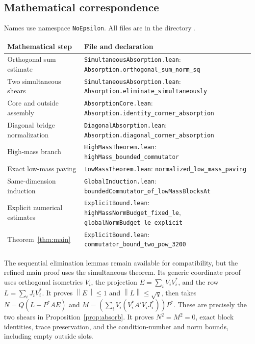 \documentclass[11pt]{article}
\theoremstyle{remark}
\newcommand{\norm}[1]{\left\lVert#1\right\rVert}
\numberwithin{equation}{section}
\begin{document}
\subsection{Mathematical correspondence}
Names use namespace \texttt{NoEpsilon}. All files are in the directory
.
\begin{center}\small
\begin{tabularx}{\textwidth}{@{}p{}X@{}}
\toprule
Mathematical step & File and declaration \\
\midrule
Orthogonal sum estimate & \texttt{SimultaneousAbsorption.lean}:\newline
\texttt{Absorption.orthogonal\_sum\_norm\_sq} \\
Two simultaneous shears & \texttt{SimultaneousAbsorption.lean}:\newline
\texttt{Absorption.eliminate\_simultaneously} \\
Core and outside assembly & \texttt{AbsorptionCore.lean}:\newline
\texttt{Absorption.identity\_corner\_absorption} \\
Diagonal bridge normalization & \texttt{DiagonalAbsorption.lean}:\newline
\texttt{Absorption.diagonal\_corner\_absorption} \\
High-mass branch & \texttt{HighMassTheorem.lean}:\newline
\texttt{highMass\_bounded\_commutator} \\
Exact low-mass paving & \texttt{LowMassTheorem.lean}:\newline
\texttt{normalized\_low\_mass\_paving} \\
Same-dimension induction & \texttt{GlobalInduction.lean}:\newline
\texttt{boundedCommutator\_of\_lowMassBlocksAt} \\
Explicit numerical estimates & \texttt{ExplicitBound.lean}:\newline
\texttt{highMassNormBudget\_fixed\_le},\newline
\texttt{globalNormBudget\_le\_explicit} \\
Theorem~\ref{thm:main} & \texttt{ExplicitBound.lean}:\newline
\texttt{commutator\_bound\_two\_pow\_3200} \\
\bottomrule
\end{tabularx}
\end{center}
The sequential elimination lemmas remain available for compatibility, but the
refined main proof uses the simultaneous theorem. Its generic coordinate
proof uses orthogonal isometries $V_i$, the projection
$E=\sum_iV_iV_i^*$, and the row $L=\sum_iJ_iV_i^*$. It proves
$\norm E\le1$ and $\norm L\le\sqrt q$, then takes
$N=Q(L-P^*AE)$ and
$M=(\sum_iV_i(V_i^*A'V_iJ_i^*))P^*$.
These are precisely the two shears in Proposition~\ref{prop:absorb}.
It proves $N^2=M^2=0$, exact block identities, trace preservation,
and the condition-number and norm bounds, including empty outside slots.
\end{document}
